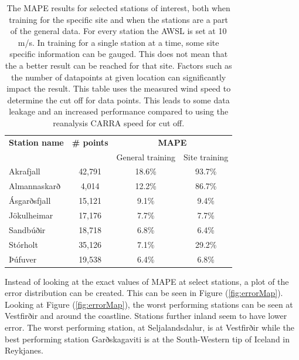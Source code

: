 \begin{table}[h]
    \caption[Model result by station]{The MAPE results for selected stations of interest, both when training for the specific site and when the stations are a part of the general data. For every station the AWSL is set at 10 m/s. In training for a single station at a time, some site specific information can be gauged. This does not mean that the a better result can be reached for that site. Factors such as the number of datapoints at given location can significantly impact the result. This table uses the measured wind speed to determine the cut off for data points. This leads to some data leakage and an increased performance compared to using the reanalysis CARRA speed for cut off.}
    \label{table:specific_sites}
    \centering
    \begin{tabular}{lccc}
        \toprule
        \textbf{Station name} & \textbf{\# points} & \multicolumn{2}{c}{\textbf{MAPE}}\\
        & & General training & Site training\\
        \midrule
        Akrafjall & 42,791 & 18.6\% & 93.7\%\\
        Almannaskarð & 4,014 & 12.2\% & 86.7\%\\
        Ásgarðsfjall & 15,121 & 9.1\% & 9.4\%\\
        Jökulheimar & 17,176 & 7.7\% & 7.7\%\\
        Sandbúðir & 18,718 & 6.8\% & 6.4\%\\
        Stórholt & 35,126 & 7.1\% & 29.2\% \\
        Þúfuver & 19,538 & 6.4\% & 6.8\%\\
        \bottomrule
    \end{tabular}
\end{table}

Instead of looking at the exact values of MAPE at select stations, a plot of the error distribution can be created. This can be seen in Figure (\ref{fig:errorMap}). Looking at Figure (\ref{fig:errorMap}), the worst performing stations can be seen at Vestfirðir and around the coastline. Stations further inland seem to have lower error. The worst performing station, at Seljalandsdalur, is at Vestfirðir while the best performing station Garðskagaviti is at the South-Western tip of Iceland in Reykjanes.


